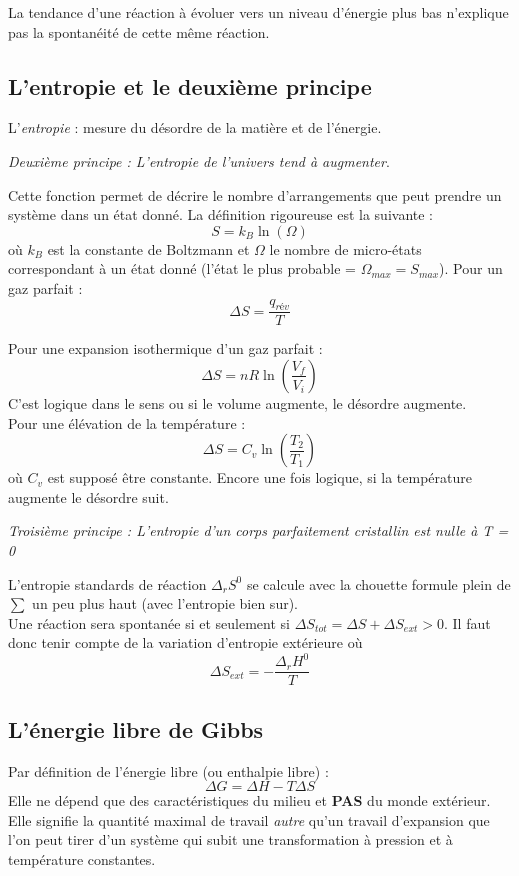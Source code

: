 \documentclass[british,french,11pt, a4paper, openany]{book}
\begin{document}
La tendance d'une réaction à évoluer vers un niveau d'énergie plus bas n'explique pas la spontanéité de cette même réaction. 

\subsection{L'entropie et le deuxième principe}
L'\textit{entropie} : mesure du désordre de la matière et de l'énergie.
\begin{center}
	\textit{Deuxième principe : L'entropie de l'univers tend à augmenter}.
\end{center}
Cette fonction permet de décrire le nombre d'arrangements que peut prendre un système dans un état donné. La définition rigoureuse est la suivante : 
$$S = k_B \ln(\Omega)$$
où $k_B$ est la constante de Boltzmann et $\Omega$ le nombre de micro-états correspondant à un état donné (l'état le plus probable = $\Omega_{max} = S_{max}$). Pour un gaz parfait : 
$$\Delta S = \frac{q_{rév}}{T}$$

Pour une expansion isothermique d'un gaz parfait : 
$$\Delta S = nR\ln\left(\frac{V_f}{V_i}\right)$$
C'est logique dans le sens ou si le volume augmente, le désordre augmente.\\

Pour une élévation de la température : 
$$\Delta S = C_v \ln\left(\frac{T_2}{T_1}\right)$$
où $C_v$ est supposé être constante. Encore une fois logique, si la température augmente le désordre suit. 
\begin{center}
	\textit{Troisième principe : L'entropie d'un corps parfaitement cristallin est nulle à T = 0}
\end{center}
L'entropie standards de réaction $\Delta_r S^0$ se calcule avec la chouette formule plein de $\sum$ un peu plus haut (avec l'entropie bien sur).\\

Une réaction sera spontanée si et seulement si $\Delta S_{tot} = \Delta S + \Delta S_{ext} > 0$. Il faut donc tenir compte de la variation d'entropie extérieure où
$$\Delta S_{ext} = -\frac{\Delta_rH^0}{T}$$


\subsection{L'énergie libre de Gibbs}
Par définition de l'énergie libre (ou enthalpie libre) : 
$$\Delta G = \Delta H - T \Delta S$$
Elle ne dépend que des caractéristiques du milieu et \textbf{PAS} du monde extérieur.  Elle signifie la quantité maximal de travail \textit{autre} qu'un travail d'expansion que l'on peut tirer d'un système qui subit une transformation à pression et à température constantes.\\
\end{document}
